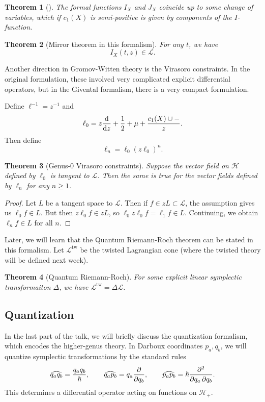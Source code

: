 \documentclass[leqno, openany]{memoir}
\newtheorem{thm}{Theorem}[section]
\theoremstyle{definition}
\theoremstyle{remark}
\theoremstyle{plain}
\theoremstyle{definition}
\theoremstyle{remark}
\newcommand{\mc}[1]{\mathcal{#1}}
\newcommand{\mr}[1]{\mathrm{#1}}
\newcommand{\wh}[1]{\widehat{#1}}
\begin{document}
\begin{thm}[{\cite{giventalmirror}}]
    The formal functions $I_X$ and $J_X$ coincide up to some change of variables, which if $c_1(X)$ is semi-positive is given by components of the $I$-function.
\end{thm}


\begin{thm}[Mirror theorem in this formalism]
    For any $t$, we have
    \[ I_X(t, z) \in \mc{L}. \]
\end{thm}

Another direction in Gromov-Witten theory is the Virasoro constraints. In the original formulation, these involved very complicated explicit differential operators, but in the Givental formalism, there is a very compact formulation.

Define $\ell^{-1} = z^{-1}$ and
\[ \ell_0 = z \odv{}{z} + \frac{1}{2} + \mu + \frac{c_1(X) \cup -}{z}. \]
Then define 
\[ \ell_n = \ell_0 (z \ell_0)^n. \]

\begin{thm}[Genus-$0$ Virasoro constraints]
    Suppose the vector field on $\mc{H}$ defined by $\ell_0$ is tangent to $\mc{L}$. Then the same is true for the vector fields defined by $\ell_n$ for any $n \geq 1$.
\end{thm}

\begin{proof}
    Let $L$ be a tangent space to $\mc{L}$. Then if $f \in zL \subset \mc{L}$, the assumption gives us $\ell_0 f \in L$. But then $z \ell_0 f \in zL$, so $\ell_0 z \ell_0 f = \ell_1 f \in L$. Continuing, we obtain $\ell_n f \in L$ for all $n$.
\end{proof}

Later, we will learn that the Quantum Riemann-Roch theorem can be stated in this formalism. Let $\mc{L}^{\mr{tw}}$ be the twisted Lagrangian cone (where the twisted theory will be defined next week).
\begin{thm}[Quantum Riemann-Roch]
    For some explicit linear symplectic transformaiton $\Delta$, we have $\mc{L}^{\mr{tw}} = \Delta \mc{L}$.
\end{thm}




\subsection{Quantization}

In the last part of the talk, we will briefly discuss the quantization formalism, which encodes the higher-genus theory. In Darboux coordinates $p_a, q_b$, we will quantize symplectic transformations by the standard rules
\[ \wh{{q_a q_b}} = \frac{q_a q_b}{\hslash}, \qquad \wh{q_a p_b} = q_a \pdv{}{q_b}, \qquad \wh{p_a p_b} = \hslash \pdv{}{q_a,q_b}. \]
This determines a differential operator acting on functions on $\mc{H}_+$.
\end{document}
